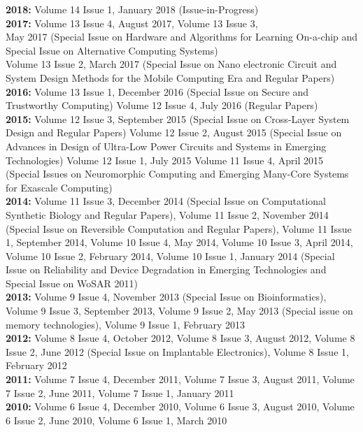 \documentclass[11pt]{article}
\begin{document}
\textbf{2018:} Volume 14 Issue 1, January 2018 (Issue-in-Progress)   \\
\textbf{2017:} Volume 13 Issue 4, August 2017,  Volume 13 Issue 3, \\
May 2017 (Special Issue on Hardware and Algorithms for Learning On-a-chip and Special Issue on Alternative Computing Systems) \\
Volume 13 Issue 2, March 2017   (Special Issue on Nano electronic Circuit and System Design Methods for the Mobile Computing Era and Regular Papers) \\
\textbf{2016:} Volume 13 Issue 1, December 2016 (Special Issue on Secure and Trustworthy Computing)
Volume 12 Issue 4, July 2016 (Regular Papers) \\
\textbf{2015:} Volume 12 Issue 3, September 2015 (Special Issue on Cross-Layer System Design and Regular Papers)
Volume 12 Issue 2, August 2015  (Special Issue on Advances in Design of Ultra-Low Power Circuits and Systems in Emerging Technologies) Volume 12 Issue 1, July 2015 Volume 11 Issue 4, April 2015 (Special Issues on Neuromorphic Computing and Emerging Many-Core Systems for Exascale Computing) \\
\textbf{2014:} Volume 11 Issue 3, December 2014 (Special Issue on Computational Synthetic Biology and Regular Papers),
Volume 11 Issue 2, November 2014 (Special Issue on Reversible Computation and Regular Papers), Volume 11 Issue 1, September 2014, Volume 10 Issue 4, May 2014, Volume 10 Issue 3, April 2014, Volume 10 Issue 2, February 2014, Volume 10 Issue 1, January 2014 (Special Issue on Reliability and Device Degradation in Emerging Technologies and Special Issue on WoSAR 2011) \\
\textbf{2013:} Volume 9 Issue 4, November 2013 (Special Issue on Bioinformatics), Volume 9 Issue 3, September 2013, Volume 9 Issue 2, May 2013 (Special issue on memory technologies), Volume 9 Issue 1, February 2013  \\
\textbf{2012:} Volume 8 Issue 4, October 2012, Volume 8 Issue 3, August 2012, Volume 8 Issue 2, June 2012 (Special Issue on Implantable Electronics), Volume 8 Issue 1, February 2012   \\
\textbf{2011:} Volume 7 Issue 4, December 2011, Volume 7 Issue 3, August 2011, Volume 7 Issue 2, June 2011, Volume 7 Issue 1, January 2011   \\
\textbf{2010:} Volume 6 Issue 4, December 2010, Volume 6 Issue 3, August 2010, Volume 6 Issue 2, June 2010, Volume 6 Issue 1, March 2010    \\
\end{document}
